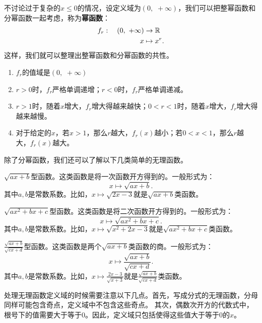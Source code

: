 \documentclass[12pt,UTF8]{ctexbook}
\begin{document}
不讨论过于复杂的$x\leqslant 0$的情况，设定义域为$(0, \,\, +\infty)$，我们可以把整幂函数和分幂函数一起考虑，称为\textbf{幂函数}：
\begin{align}
    f_r :\quad (0, \,\, +\infty) &\rightarrow \mathbb{R} \notag \\
    x &\mapsto x^r. \notag
\end{align}
这样，我们就可以整理出整幂函数和分幂函数的共性。
\begin{enumerate}
    \item $f_r$的值域是$(0, \,\, +\infty)$
    \item $r > 0$时，$f_r$严格单调递增；$r < 0$时，$f_r$严格单调递减。
    \item $r>1$时，随着$x$增大，$f_r$增大得越来越快；$0 < r < 1$时，随着$x$增大，$f_r$增大得越来越慢。
    \item 对于给定的$x$，若$x>1$，那么$r$越大，$f_r(x)$越小；若$0 < x<1$，那么$r$越大，$f_r(x)$越大。
\end{enumerate}

除了分幂函数，我们还可以了解以下几类简单的无理函数。

$\sqrt{ax + b}$型函数。这类函数是将一次函数开方得到的。一般形式为：
$$ x\mapsto \sqrt{ax + b}.$$
其中$a, b$是常数系数。比如，$x\mapsto \sqrt{2x - 3}$就是$\sqrt{ax + b}$类函数。

$\sqrt{ax^2 + bx + c}$型函数。这类函数是将二次函数开方得到的。一般形式为：
$$ x\mapsto \sqrt{ax^2 + bx + c}.$$
其中$a, b$是常数系数。比如，$x\mapsto \sqrt{x^2 + 2x - 3}$就是$\sqrt{ax^2 + bx + c}$类函数。

$\frac{\sqrt{ax + b}}{\sqrt{cx + d}}$型函数。这类函数是两个$\sqrt{ax + b}$类函数的商。一般形式为：
$$ x\mapsto \frac{\sqrt{ax + b}}{\sqrt{cx + d}}.$$
其中$a, b$是常数系数。比如，$x\mapsto \frac{2x - 3}{\sqrt{x + 3}}$就是$\frac{\sqrt{ax + b}}{\sqrt{cx + d}}$类函数。

处理无理函数定义域的时候需要注意以下几点。首先，写成分式的无理函数，分母同样可能包含奇点，定义域中不包含这些奇点。
其次，偶数次开方的代数式中，根号下的值需要大于等于$0$。因此，定义域只包括使得这些值大于等于$0$的$x$。
\end{document}
